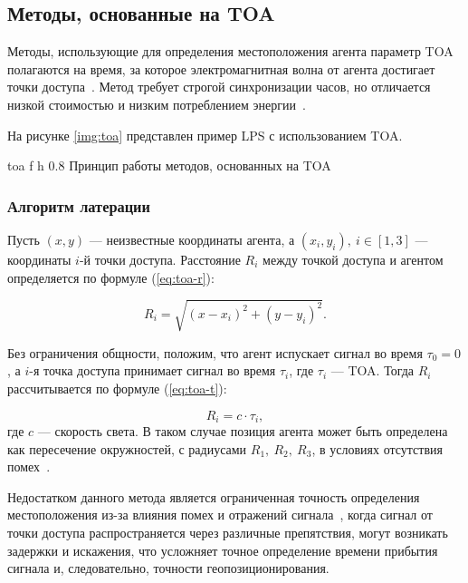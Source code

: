 \clearpage

\subsection{Методы, основанные на TOA}

Методы, использующие для определения местоположения агента параметр TOA полагаются на время, за которое электромагнитная волна от агента достигает точки доступа~\cite{trends}. Метод требует строгой синхронизации часов, но отличается низкой стоимостью и низким потреблением энергии~\cite{toa}.

На рисунке \ref{img:toa} представлен пример LPS с использованием TOA.

    {toa}
    {f}
    {h}
    {0.8\linewidth}
    {Принцип работы методов, основанных на TOA}

\subsubsection{Алгоритм латерации}

Пусть $(x, y)$ --- неизвестные координаты агента, а $(x_i, y_i),~i \in [1, 3]$ --- координаты $i$-й точки доступа. Расстояние $R_i$ между точкой доступа и агентом определяется по формуле (\ref{eq:toa-r}):

\begin{equation}
    R_i = \sqrt{(x - x_i)^2 + (y - y_i)^2}.
    \label{eq:toa-r}
\end{equation}

Без ограничения общности, положим, что агент испускает сигнал во время $\tau_0 = 0$, а $i$-я точка доступа принимает сигнал во время $\tau_i$, где $\tau_i$ --- TOA. Тогда $R_i$ рассчитывается по формуле (\ref{eq:toa-t}):

\begin{equation}
    R_i = c \cdot \tau_i,
    \label{eq:toa-t}
\end{equation}
где $c$ --- скорость света. В таком случае позиция агента может быть определена как пересечение окружностей, с радиусами $R_1,~R_2,~R_3$, в условиях отсутствия помех~\cite{toa}.

Недостатком данного метода является ограниченная точность определения местоположения из-за влияния помех и отражений сигнала~\cite{toa}, когда сигнал от точки доступа распространяется через различные препятствия, могут возникать задержки и искажения, что усложняет точное определение времени прибытия сигнала и, следовательно, точности геопозиционирования.

